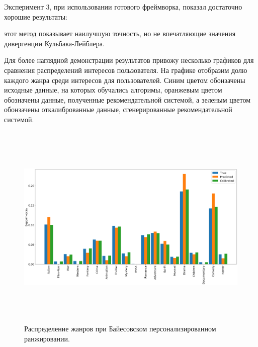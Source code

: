 Эксперимент 3, при использовании готового фреймворка, показал достаточно хорошие результаты:
\begin{center}
   \end{center}
этот метод показывает наилучшую точность, но не впечатляющие значения дивергенции Кульбака-Лейблера.

Для более наглядной демонстрации результатов привожу несколько графиков для сравнения распределений интересов пользователя.
На графике отобразим долю каждого жанра среди интересов для пользователей. 
Синим цветом обонзачены исходные данные, на которых обучались алгоримы,
оранжевым цветом обозначены данные, полученные рекомендательной системой,
а зеленым цветом обонзачены откалиброванные данные, сгенерированные рекомендательной системой.
\begin{figure}[ht]
   \begin{flushleft}
      \includegraphics[width=17.5cm, height=10cm]{images/bay.png}
   
   \caption{
   \label{graph-KL}
        Распределение жанров при Байесовском персонализированном ранжировании.}
   \end {flushleft}

   \end {figure}

\pagebreak

